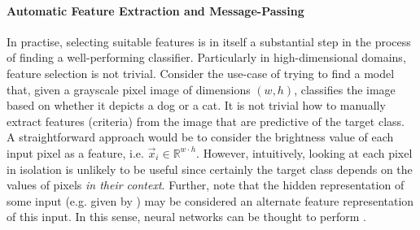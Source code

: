\documentclass[
	fontsize=10pt, %
	twoside=false, %
	secnumdepth=1, %
  toc=indentunnumbered %
]{kaobook}
\begin{document}
\paragraph{Automatic Feature Extraction and Message-Passing}
In practise, selecting suitable features is in itself a substantial
step in the process of finding a well-performing classifier.
%
Particularly in high-dimensional domains, feature selection is not trivial.
Consider the use-case of trying to find a model that, given a grayscale pixel
image of dimensions $(w, h)$, classifies the image based on whether it depicts a
dog or a cat. It is not trivial how to manually extract features (criteria) from
the image that are predictive of the target class. A straightforward approach
would be to consider the brightness value of each input pixel as a feature, i.e.
$\vec x_i \in \mathbb{R}^{w \cdot h}$. However, intuitively, looking at each
pixel in isolation is unlikely to be useful since certainly the target class
depends on the values of pixels \textit{in their context}.
Further, note that the hidden representation of some input (e.g. given by
) may be considered an alternate feature representation
of this input. In this sense, neural networks can be thought to perform
. 

\end{document}
